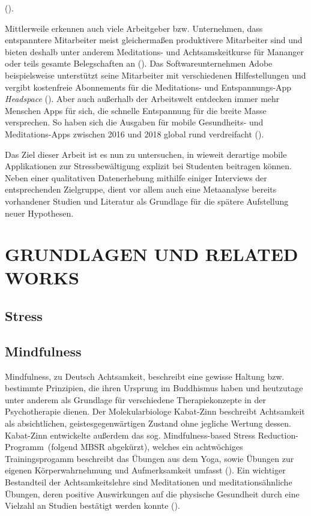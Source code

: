 \documentclass[10pt]{article}
\newcommand{\zit}[1]{(\cite{#1})}
\begin{document}
\zit{Stressbewältigung}.

Mittlerweile erkennen auch viele Arbeitgeber bzw. Unternehmen, dass entspanntere Mitarbeiter meist gleichermaßen produktivere Mitarbeiter sind und bieten deshalb unter anderem Meditations- und Achtsamskeitkurse für Mananger oder teils gesamte Belegschaften an \zit{Handelsblatt}. Das Softwareunternehmen Adobe beispielsweise unterstützt seine Mitarbeiter mit verschiedenen Hilfestellungen und vergibt kostenfreie Abonnements für die Meditations- und Entspannungs-App \textit{Headspace} \zit{Adobe}. 
Aber auch außerhalb der Arbeitswelt entdecken immer mehr Menschen Apps für sich, die schnelle Entspannung für die breite Masse versprechen. So haben sich die Ausgaben für mobile Gesundheits- und Meditations-Apps zwischen 2016 und 2018 global rund verdreifacht \zit{SteigendeNutzung}.

Das Ziel dieser Arbeit ist es nun zu untersuchen, in wieweit derartige mobile Applikationen zur Stressbewältigung explizit bei Studenten beitragen können.
Neben einer qualitativen Datenerhebung mithilfe einiger Interviews der entsprechenden Zielgruppe, dient vor allem auch eine Metaanalyse bereits vorhandener Studien und Literatur als Grundlage für die spätere Aufstellung neuer Hypothesen.
\bigbreak


\section{GRUNDLAGEN UND RELATED WORKS}

\subsection{Stress}
\subsection{Mindfulness}
Mindfulness, zu Deutsch Achtsamkeit, beschreibt eine gewisse Haltung bzw. bestimmte Prinzipien, die ihren Ursprung im Buddhismus haben und heutzutage unter anderem als Grundlage für verschiedene Therapiekonzepte in der Psychotherapie dienen. Der Molekularbiologe Kabat-Zinn beschreibt Achtsamkeit als absichtlichen, geistesgegenwärtigen Zustand ohne jegliche Wertung dessen. Kabat-Zinn entwickelte außerdem das sog. \grqq Mindfulness-based Stress Reduction-Programm\grqq\ (folgend MBSR abgekürzt), welches ein achtwöchiges Trainingsprogamm beschreibt das Übungen aus dem Yoga, sowie Übungen zur eigenen Körperwahrnehmung und Aufmerksamkeit umfasst \zit{AchtsamkeitBasics}.  Ein wichtiger Bestandteil der Achtsamkeitslehre sind Meditationen und meditationsähnliche Übungen, deren positive Auswirkungen auf die physische Gesundheit durch eine Vielzahl an Studien bestätigt werden konnte \zit{MindfulnessEffects}.
\end{document}
